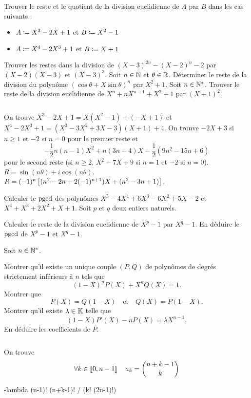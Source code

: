 \documentclass{magnolia}
\begin{document}


\begin{questions}
\question Trouver le reste et le quotient de la division euclidienne de $A$ par
  $B$ dans les cas suivants :
  \begin{itemize}
  \item $A\coloneqq X^3-2X+1$ et $B\coloneqq X^2-1$
  \item $A\coloneqq X^4-2X^3+1$ et $B\coloneqq X+1$
  \end{itemize}
\question Trouver les restes dans la division de $(X-3)^{2n}-(X-2)^{n}-2$ par
  $(X-2)(X-3)$ et $(X-3)^3$.
\question Soit $n\in\mathbb{N}$ et $\theta\in\mathbb{R}$. Déterminer le reste de la division
  du polynôme $(\cos\theta+X\sin\theta)^n$ par $X^2+1$.
\question Soit $n\in{\mathbb{N}^*}$. Trouver le reste de la division euclidienne de
  $X^n+nX^{n-1}+X^2+1$ par $(X+1)^2$.
\end{questions}
\begin{sol}
$\quad$
\begin{questions}
\question On trouve $X^3-2X+1=X(X^2-1)+(-X+1)$ et
  $X^4-2X^3+1=(X^3-3X^2+3X-3)(X+1)+4$.
\question On trouve $-2X+3$ si $n\geq 1$ et $-2$ si $n=0$ pour le premier
  reste et
  \[-\frac{1}{2}n(n-1)X^2+n(3n-4)X-\frac{1}{2}(9n^2-15n+6)\]
  pour le second reste (si $n\geq 2$, $X^2-7X+9$ si $n=1$ et $-2$ si $n=0$).
\question $R=\sin(n\theta)+i\cos(n\theta)$.
\question $R=(-1)^n \left[(n^2-2n+2(-1)^{n+1})X+(n^2-3n+1)\right]$.
\end{questions}
\end{sol}

\begin{questions}
\question Calculer le $\operatorname{pgcd}$ des polynômes $X^5-4X^4+6X^3-6X^2+5X-2$ et
  $X^4+X^3+2X^2+X+1$.
\question Soit $p$ et $q$ deux entiers naturels.
  \begin{questions}
  \question Calculer le reste de la division euclidienne de $X^p-1$ par
    $X^q-1$.
  \question En déduire le $\operatorname{pgcd}$ de $X^p-1$ et $X^q-1$.
  \end{questions}
\end{questions}

Soit $n\in{\mathbb{N}^*}$.
\begin{questions}
\question Montrer qu'il existe un unique couple $(P,Q)$ de polynômes de degrés
  strictement inférieurs à $n$ tels que
  $$(1-X)^n P(X) + X^n Q(X)=1.$$
\question Montrer que
  $$P(X)=Q(1-X) \quad \text{et} \quad Q(X)=P(1-X).$$
\question Montrer qu'il existe $\lambda\in\mathbb{K}$ telle que
  $$(1-X)P'(X)-nP(X)=\lambda X^{n-1}.$$
\question En déduire les coefficients de $P$.
\end{questions}
\begin{sol}
$\quad$
\begin{questions}
\question
\question
\question
\question On trouve
  \[\forall k\in\left\llbracket 0,n-1\right\rrbracket \quad a_k=\binom{n+k-1}{k}\]

  -lambda (n-1)! (n+k-1)! / (k! (2n-1)!)
\end{questions}
\end{sol}
\end{document}
